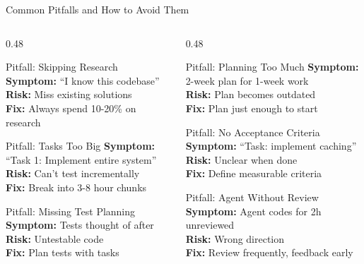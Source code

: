 \documentclass[aspectratio=169,10pt]{beamer}
\begin{document}
\begin{frame}{Common Pitfalls and How to Avoid Them}
    \begin{columns}[T]
        \begin{column}{0.48\textwidth}
            \begin{alertblock}{Pitfall: Skipping Research}
                \textbf{Symptom:} ``I know this codebase''\\
                \textbf{Risk:} Miss existing solutions\\
                \textbf{Fix:} Always spend 10-20\% on research
            \end{alertblock}
            \begin{alertblock}{Pitfall: Tasks Too Big}
                \textbf{Symptom:} ``Task 1: Implement entire system''\\
                \textbf{Risk:} Can't test incrementally\\
                \textbf{Fix:} Break into 3-8 hour chunks
            \end{alertblock}
            \begin{alertblock}{Pitfall: Missing Test Planning}
                \textbf{Symptom:} Tests thought of after\\
                \textbf{Risk:} Untestable code\\
                \textbf{Fix:} Plan tests with tasks
            \end{alertblock}
        \end{column}
        \begin{column}{0.48\textwidth}
            \begin{alertblock}{Pitfall: Planning Too Much}
                \textbf{Symptom:} 2-week plan for 1-week work\\
                \textbf{Risk:} Plan becomes outdated\\
                \textbf{Fix:} Plan just enough to start
            \end{alertblock}
            \begin{alertblock}{Pitfall: No Acceptance Criteria}
                \textbf{Symptom:} ``Task: implement caching''\\
                \textbf{Risk:} Unclear when done\\
                \textbf{Fix:} Define measurable criteria
            \end{alertblock}
            \begin{alertblock}{Pitfall: Agent Without Review}
                \textbf{Symptom:} Agent codes for 2h unreviewed\\
                \textbf{Risk:} Wrong direction\\
                \textbf{Fix:} Review frequently, feedback early
            \end{alertblock}
        \end{column}
    \end{columns}

\end{frame}
\end{document}
